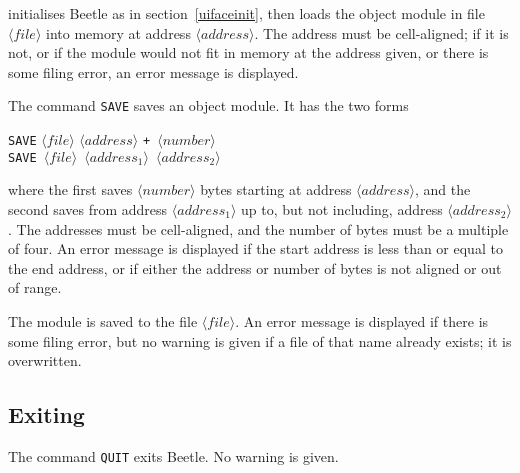 \documentclass[english]{article}
\newcommand{\angb}[1]{$\langle #1\rangle$}
\begin{document}
initialises Beetle as in section~\ref{uifaceinit}, then loads the object
module in file \angb{file} into memory at address \angb{address}. The address
must be cell-aligned; if it is not, or if the module would not fit in memory
at the address given, or there is some filing error, an error message is
displayed.

The command {\tt SAVE} saves an object module. It has the two forms

\begin{center}
{\tt SAVE} \angb{file} \angb{address} \tt{+} \angb{number}\\
{\tt SAVE} \angb{file} \angb{address_1} \angb{address_2}
\end{center}

where the first saves \angb{number} bytes starting at address \angb{address},
and the second saves from address \angb{address_1} up to, but not including,
address \angb{address_2}. The addresses must be cell-aligned, and the number
of bytes must be a multiple of four. An error message is displayed if the
start address is less than or equal to the end address, or if either the
address or number of bytes is not aligned or out of range.

The module is saved to the file \angb{file}. An error message is displayed if
there is some filing error, but no warning is given if a file of that name
already exists; it is overwritten.

\subsection{Exiting}

The command {\tt QUIT} exits Beetle. No warning is given.




\end{document}
